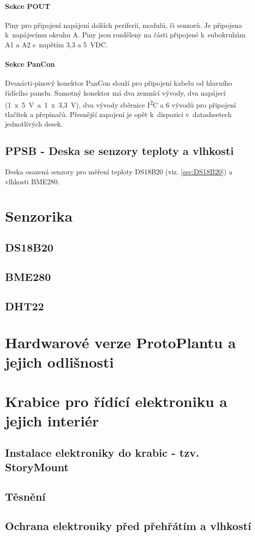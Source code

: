 \paragraph{Sekce POUT} 
Piny pro připojení napájení dalších periferií, modulů, či senzorů.
Je připojena k~napájecímu okruhu A.
Piny jsou rozděleny na části připojené k~subokruhům A1 a A2 s~napětím 3,3 a 5~VDC.

\paragraph{Sekce PanCon}
Dvanácti-pinový konektor PanCon slouží pro připojení kabelu od hlavního řídícího panelu. 
Samotný konektor má dva zemnící vývody, dva napájecí (1~x~5~V~a~1~x~3,3~V), dva vývody sběrnice I\textsuperscript{2}C a 6 vývodů pro připojení tlačítek a přepínačů.
Přesnější zapojení je opět k~dispozici v~datasheetech jednotlivých desek.

\subsection{PPSB - Deska se senzory teploty a vlhkosti}
Deska osazená senzory pro měření teploty DS18B20 (viz. \autoref{sec:DS18B20}) a vlhkosti BME280. 

\section{Senzorika}

\subsection{DS18B20}
\label{sec:DS18B20}

\subsection{BME280}
\label{sec:BME280}

\subsection{DHT22}
\label{sec:DHT22}

\section{Hardwarové verze ProtoPlantu a jejich odlišnosti}


\section{Krabice pro řídící elektroniku a jejich interiér}


\subsection{Instalace elektroniky do krabic - tzv. StoryMount}


\subsection{Těsnění}


\subsection{Ochrana elektroniky před přehřátím a vlhkostí}


\newpage